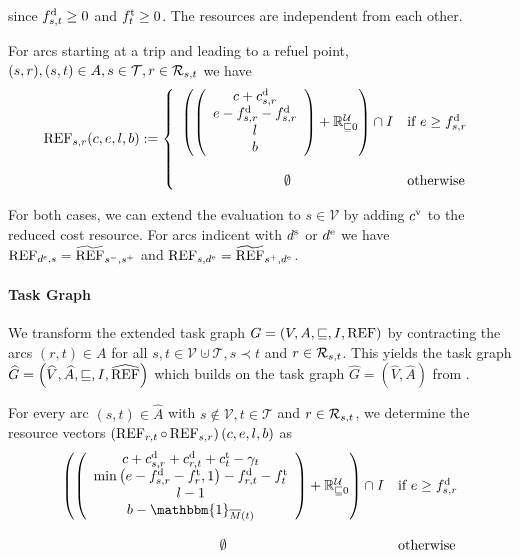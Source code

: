 since $f^{\operatorname{d}}_{s,t}\geq 0$ and $f^{\operatorname{t}}_t\geq 0$. The resources are independent from each other.

For arcs starting at a trip and leading to a refuel point, \ie $(s,r),(s,t)\in A, s\in\mathcal{T}, r\in\mathcal{R}_{s,t}$ we have
\begin{align*}
	\operatorname{REF}_{s,r}(c,e,l,b) := \left\{ \begin{array}{cl}
		\left(\left( \begin{array}{c}
			c + c^{\operatorname{d}}_{s,r} \\ e - f^{\operatorname{d}}_{s,r} - f^{\operatorname{d}}_{s,r} \\ l \\ b
		\end{array} \right) + \mathbb{R}^{\mathcal{U}}_{\sqsubseteq 0}\right) \cap I & \text{if } e\geq f^{\operatorname{d}}_{s,r} \\
		\\
		\emptyset & \text{otherwise}
	\end{array} \right.
\end{align*}

For both cases, we can extend the evaluation to $s\in\mathcal{V}$ by adding $c^{\operatorname{v}}$ to the reduced cost resource. For arcs indicent with $d^{\operatorname{s}}$ or $d^{\operatorname{e}}$ we have ${\operatorname{REF}_{d^{\operatorname{s}},s}=\widetilde{\operatorname{REF}}_{s^-,s^+}}$ and ${\operatorname{REF}_{s,d^{\operatorname{e}}}=\widetilde{\operatorname{REF}}_{s^+,d^{\operatorname{e}}}}$.

\paragraph{Task Graph} \parfill

We transform the extended task graph ${G=\left(V,A,\sqsubseteq,I,\operatorname{REF}\right)}$ by contracting the arcs ${(r,t)\in A}$ for all ${s,t\in\mathcal{V}\cupdot\mathcal{T}}, {s\prec t}$ and ${r\in\mathcal{R}_{s,t}}$. This yields the task graph ${\widehat{G}=\left(\widehat{V},\widehat{A},\sqsubseteq,I,\widehat{\operatorname{REF}}\right)}$ which builds on the task graph ${\widehat{G}=\left(\widehat{V},\widehat{A}\right)}$ from . 

For every arc $(s,t)\in\widehat{A}$ with $s\notin\mathcal{V}, t\in\mathcal{T}$ and $r\in\mathcal{R}_{s,t}$, we determine the resource vectors ${\left(\operatorname{REF}_{r,t}\circ\operatorname{REF}_{s,r}\right)(c,e,l,b)}$ as
\begin{align*}
	\begin{array}{cl}
		\left(\left( \begin{array}{c}
			c + \cd_{s,r} + \cd_{r,t} + \ct_t - \gamma_t \\ \min\left(e-\fd_{s,r}-\ft_r, 1\right) - \fd_{r,t} - \ft_t \\ l - 1 \\ b - \mathbbm{1}_{\overline{M}(t)}
		\end{array} \right) + \mathbb{R}^{\mathcal{U}}_{\sqsubseteq 0} \right) \cap I & \text{if } e\geq\fd_{s,r} \\
		\\
		\emptyset & \text{otherwise}
	\end{array}
\end{align*}

